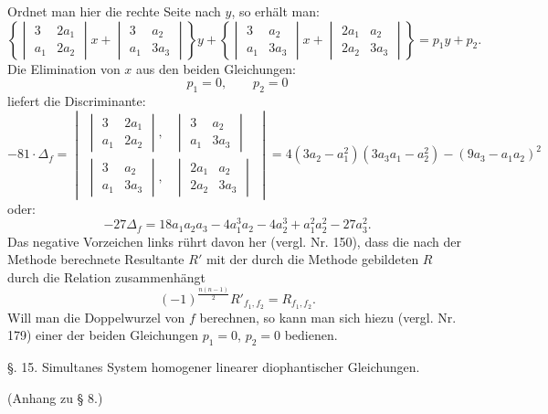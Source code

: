 Ordnet man hier die rechte Seite nach $y$, so erhält man:
\[
\left\{\begin{vmatrix} 3 & 2a_1 \\ a_1 & 2a_2 \end{vmatrix} x + \begin{vmatrix} 3 & a_2 \\ a_1 & 3a_3 \end{vmatrix}\right\} y
+ \left\{\begin{vmatrix} 3 & a_2 \\ a_1 & 3a_3 \end{vmatrix} x + \begin{vmatrix} 2a_1 & a_2 \\ 2a_2 & 3a_3 \end{vmatrix}\right\} = p_1y+p_2.
\]
Die Elimination von $x$ aus den beiden Gleichungen:
\[
p_1=0, \qquad p_2=0
\]
liefert die Discriminante:
\[
-81\cdot\Delta_f=
\begin{vmatrix}
\begin{vmatrix} 3 & 2a_1 \\ a_1 & 2a_2 \end{vmatrix}, & \begin{vmatrix} 3 & a_2 \\ a_1 & 3a_3 \end{vmatrix} \\
\begin{vmatrix} 3 & a_2 \\ a_1 & 3a_3 \end{vmatrix}, & \begin{vmatrix} 2a_1 & a_2 \\ 2a_2 & 3a_3 \end{vmatrix}
\end{vmatrix}
= 4(3a_2-a_1^2)(3a_3a_1-a_2^2)-(9a_3-a_1a_2)^2
\]
oder:
\[
-27\Delta_f = 18a_1a_2a_3 - 4a_1^3a_2 - 4a_2^3 + a_1^2a_2^2 - 27a_3^2.
\]
Das negative Vorzeichen links rührt davon her (vergl. Nr. 150), dass die nach der  Methode berechnete Resultante $R'$ mit der durch die  Methode gebildeten $R$ durch die Relation zusammenhängt
\[
(-1)^{\frac{n(n-1)}{2}} R'_{f_1,f_2} = R_{f_1,f_2}.
\]
Will man die Doppelwurzel von $f$ berechnen, so kann man sich hiezu (vergl. Nr. 179) einer der beiden Gleichungen $p_1=0$, $p_2=0$ bedienen.

§. 15. Simultanes System homogener linearer diophantischer Gleichungen.

(Anhang zu § 8.)

